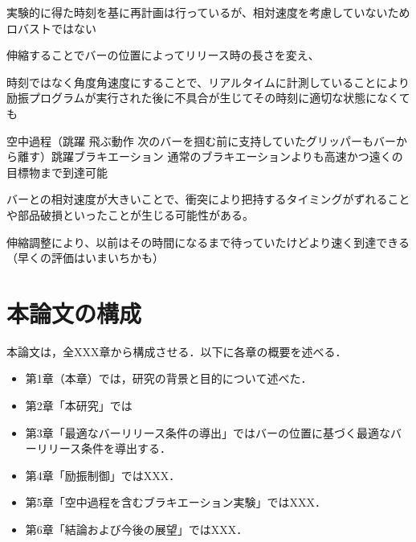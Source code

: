           実験的に得た時刻を基に再計画は行っているが、相対速度を考慮していないためロバストではない

          伸縮することでバーの位置によってリリース時の長さを変え、

          時刻ではなく角度角速度にすることで、リアルタイムに計測していることにより励振プログラムが実行された後に不具合が生じてその時刻に適切な状態になくても

          空中過程（跳躍 飛ぶ動作 次のバーを掴む前に支持していたグリッパーもバーから離す）跳躍ブラキエーション
          通常のブラキエーションよりも高速かつ遠くの目標物まで到達可能
          
          バーとの相対速度が大きいことで、衝突により把持するタイミングがずれることや部品破損といったことが生じる可能性がある。

          伸縮調整により、以前はその時間になるまで待っていたけどより速く到達できる（早くの評価はいまいちかも）


        \section{本論文の構成}

          本論文は，全XXX章から構成させる．以下に各章の概要を述べる．
          \begin{itemize}
            \item 第1章（本章）では，研究の背景と目的について述べた．
            \item 第2章「本研究」では
            \item 第3章「最適なバーリリース条件の導出」ではバーの位置に基づく最適なバーリリース条件を導出する．
            \item 第4章「励振制御」ではXXX．
            \item 第5章「空中過程を含むブラキエーション実験」ではXXX．
            \item 第6章「結論および今後の展望」ではXXX．
          \end{itemize}

